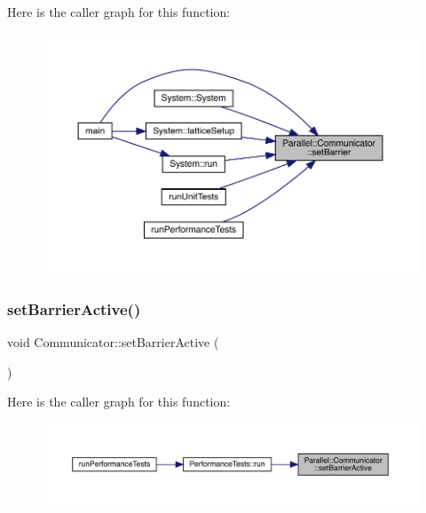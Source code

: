 Here is the caller graph for this function\+:
\nopagebreak
\begin{figure}[H]
\begin{center}
\leavevmode
\includegraphics[width=350pt]{class_parallel_1_1_communicator_a14aa3d54f5efe28094df886948e3dee2_icgraph}
\end{center}
\end{figure}
\mbox{\label{class_parallel_1_1_communicator_af61a4b8a49509982ae96d2a99dfb9f49}} 
\subsubsection{\texorpdfstring{setBarrierActive()}{setBarrierActive()}}
{\footnotesize\ttfamily void Communicator\+::set\+Barrier\+Active (\begin{DoxyParamCaption}{ }\end{DoxyParamCaption})\hspace{0.3cm}{\ttfamily [static]}}

Here is the caller graph for this function\+:
\nopagebreak
\begin{figure}[H]
\begin{center}
\leavevmode
\includegraphics[width=350pt]{class_parallel_1_1_communicator_af61a4b8a49509982ae96d2a99dfb9f49_icgraph}
\end{center}
\end{figure}
\mbox{\label{class_parallel_1_1_communicator_a1db417babab93c8d8bf6339ff2bab540}} 

